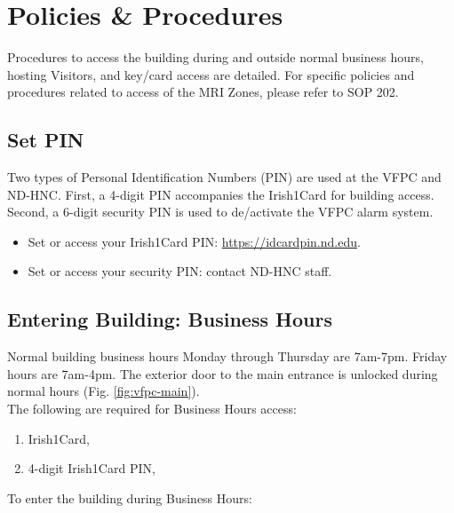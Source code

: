 \documentclass[11pt]{article}
\begin{document}
\section{Policies \& Procedures}

Procedures to access the building during and outside normal business hours, hosting Visitors, and key/card access are detailed. For specific policies and procedures related to access of the MRI Zones, please refer to SOP 202.

\subsection{Set PIN}
\label{ssec:set-pin}
Two types of Personal Identification Numbers (PIN) are used at the VFPC and ND-HNC. First, a 4-digit PIN accompanies the Irish1Card for building access. Second, a 6-digit security PIN is used to de/activate the VFPC alarm system.

\begin{itemize}
	\item Set or access your Irish1Card PIN: \url{https://idcardpin.nd.edu}.
	\item Set or access your security PIN: contact ND-HNC staff.
\end{itemize}

\subsection{Entering Building: Business Hours}
\label{ssec:enter-norm}

Normal building business hours Monday through Thursday are 7am-7pm. Friday hours are 7am-4pm. The exterior door to the main entrance is unlocked during normal hours (Fig. \ref{fig:vfpc-main}).\\

The following are required for Business Hours access:

\begin{enumerate}
	\item Irish1Card,
	\item 4-digit Irish1Card PIN,
\end{enumerate}

To enter the building during Business Hours:
\end{document}
